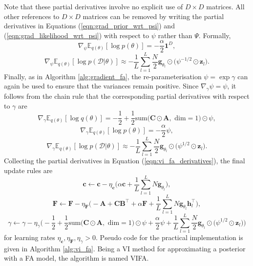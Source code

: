 \documentclass[msc,deptreport.inf]{infthesis} %
\newcommand{\matr}[1]{\mathbf{#1}}
\newcommand{\E}{\mathbb E}
\begin{document}
Note that these partial derivatives involve no explicit use of $D \times D$ matrices. All other references to $D \times D$ matrices can be removed by writing the partial derivatives in Equations (\ref{eqn:grad_prior_wrt_psi}) and (\ref{eqn:grad_likelihood_wrt_psi}) with respect to $\psi$ rather than $\Psi$. Formally,
\begin{equation}
	\nabla_\psi \E_{q(\theta)} [\log p(\theta)] = -\frac{\alpha}{2} \matr{1}^D,
\end{equation}
\begin{equation}
	\nabla_\psi \E_{q(\theta)} [\log p(\mathcal{D} | \theta)]
	 \approx  -\frac{1}{L} \sum_{l=1}^{L} \frac{N}{2} \matr{g}_{\theta_l} \odot \big(\psi^{-1/2} \odot \matr{z}_l \big).
\end{equation}
Finally, as in Algorithm \ref{alg:gradient_fa}, the re-parameterisation $\psi = \exp \gamma$ can again be used to ensure that the variances remain positive. Since $\nabla_\gamma \psi = \psi$, it follows from the chain rule that the corresponding partial derivatives with respect to $\gamma$ are 
\begin{equation}
	\nabla_\gamma \E_{q(\theta)} [\log q(\theta)] = -\frac{1}{2} + \frac{1}{2} \text{sum}\big(\matr{C} \odot \matr{A}, \text{ dim} = 1\big) \odot \psi,
\end{equation}
\begin{equation}
	\nabla_\gamma \E_{q(\theta)} [\log p(\theta)] = -\frac{\alpha}{2} \psi,
\end{equation}
\begin{equation}
	\nabla_\gamma \E_{q(\theta)} [\log p(\mathcal{D} | \theta)]
	 \approx  -\frac{1}{L} \sum_{l=1}^{L} \frac{N}{2} \matr{g}_{\theta_l} \odot \big(\psi^{1/2} \odot \matr{z}_l \big).
\end{equation}
Collecting the partial derivatives in Equation (\ref{eqn:vi_fa_derivatives}), the final update rules are
 \begin{equation}\label{eqn:vifa_c_update}
	\matr{c} \leftarrow \matr{c} - \eta_\matr{c}\Bigg(
	\alpha \matr{c} + \frac{1}{L} \sum_{l=1}^{L} N \matr{g}_{\theta_l}
	\Bigg),
\end{equation}
 \begin{equation}\label{eqn:vifa_F_update}
	\matr{F} \leftarrow \matr{F} - \eta_\matr{F}\Bigg(
	-\matr{A}  + \matr{C} \matr{B}^\intercal+ \alpha \matr{F} + \frac{1}{L} \sum_{l=1}^{L} N \matr{g}_{\theta_l} \matr{h}_l^\intercal
	\Bigg),
\end{equation}
\begin{equation}\label{eqn:vifa_gamma_update}
	\gamma \leftarrow \gamma - \eta_\gamma\Bigg(
	-\frac{1}{2} + \frac{1}{2} \text{sum}\big(\matr{C} \odot \matr{A}, \text{ dim} = 1\big) \odot \psi
	+\frac{\alpha}{2} \psi + \frac{1}{L} \sum_{l=1}^{L} \frac{N}{2} \matr{g}_{\theta_l} \odot \big(\psi^{1/2} \odot \matr{z}_l \big)
	\Bigg)
\end{equation}
for learning rates $\eta_\matr{c},  \eta_\matr{F}, \eta_\gamma > 0$. Pseudo code for the practical implementation is given in Algorithm \ref{alg:vi_fa}. Being a VI method for approximating a posterior with a FA model, the algorithm is named VIFA.
\end{document}
